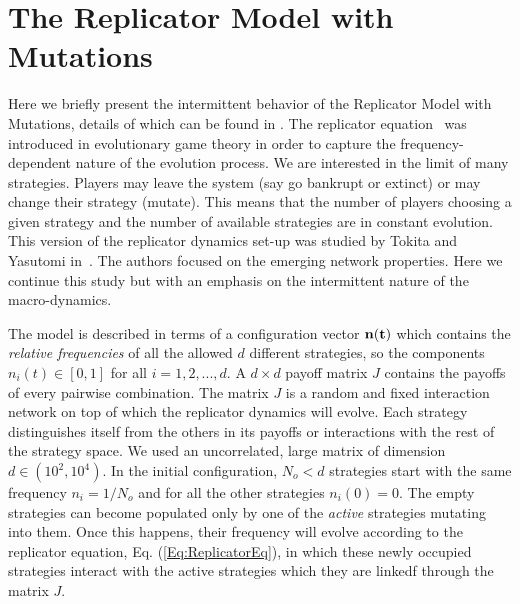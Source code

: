 \documentclass[12pt]{article}
\begin{document}


\section{The Replicator Model with Mutations}
Here we briefly present the intermittent behavior of the Replicator Model with Mutations, details of which can be found in \cite{DP_JG_HJJ_2016}. The replicator equation~\cite{taylor1978evolutionary} was introduced in evolutionary game theory in order to capture the frequency-dependent nature of the evolution process. We are interested in the limit of many strategies. Players may leave the system (say go bankrupt or extinct) or may change their strategy (mutate). This means that the number of players choosing a given strategy and the number of available strategies are in constant evolution. This version of the replicator dynamics set-up was studied by Tokita and Yasutomi in~\cite{tokita2003emergence}. The authors focused on the emerging network properties. Here we continue this study but with an emphasis on the intermittent nature of the macro-dynamics.

The model is described in terms of a configuration vector $\bf{n}(t)$ which contains the \emph{relative frequencies} of all the allowed $d$ different strategies, so the components $n_i(t)\in[0,1]$ for all $i=1,2,...,d$. A $d\times d$ payoff matrix $J$ contains the payoffs of every pairwise combination. The matrix $J$ is a random and fixed interaction network on top of which the replicator dynamics will evolve. Each strategy distinguishes itself from the others in its payoffs or interactions with the rest of the strategy space. We used an uncorrelated, large matrix of dimension  $d\in ( 10^2 ,10^4)$. In the initial configuration, $N_{o}<d$ strategies start with the same frequency $n_i =1/N_{o}$ and for all the other strategies $n_i(0)=0$. The empty strategies can become populated only by one of the \emph{active} strategies mutating into them. Once this happens, their frequency will evolve according to the replicator equation, Eq. (\ref{Eq:ReplicatorEq}), in which these newly occupied strategies interact with the active strategies which they are linkedf through the matrix $J$. 
\end{document}
